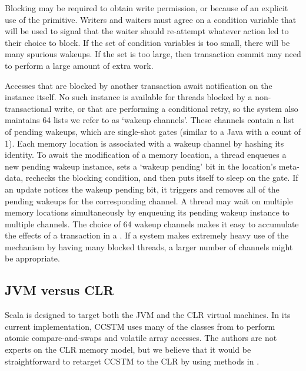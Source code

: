 Blocking may be required to obtain write permission, or because of an
explicit use of the  primitive.  Writers and waiters must
agree on a condition variable that will be used to signal that the
waiter should re-attempt whatever action led to their choice to block.
If the set of condition variables is too small, there will be many
spurious wakeups.  If the set is too large, then transaction commit may need to
perform a large amount of extra work.

Accesses that are blocked by another transaction await notification
on the  instance itself.  No such instance is available for
threads blocked by a non-transactional write, or that are performing a
conditional retry, so the system also maintains 64 lists we refer to as
`wakeup channels'.  These channels contain a list of pending wakeups,
which are single-shot gates (similar to a Java 
with a count of 1).  Each memory location is associated with a wakeup
channel by hashing its identity.  To await the modification of a
memory location, a thread enqueues a new pending wakeup instance,
sets a `wakeup pending' bit in the location's meta-data, rechecks the
blocking condition, and then puts itself to sleep on the gate.  If an
update notices the wakeup pending bit, it triggers and removes all of
the pending wakeups for the corresponding channel.  A thread may wait on
multiple memory locations simultaneously by enqueuing its pending wakeup
instance to multiple channels.  The choice of 64 wakeup channels makes
it easy to accumulate the effects of a transaction in a .
If a system makes extremely heavy use of the  mechanism by
having many blocked threads, a larger number of channels might be appropriate.

\subsection{JVM versus CLR}

Scala is designed to target both the JVM and the CLR virtual machines.  In
its current implementation, CCSTM uses many of the  classes
from  to perform atomic compare-and-swaps and
volatile array accesses.  The authors are not experts on the CLR memory
model, but we believe that it would be straightforward to retarget CCSTM
to the CLR by using methods in .

